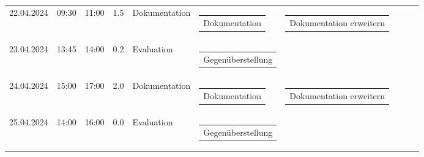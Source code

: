 {\begin{longtable}[H]{lllrllllll}
22.04.2024 & 09:30 & 11:00 & 1.5 & Dokumentation & \begin{tabular}[c]{@{}l@{}}Dokumentation\end{tabular} & \begin{tabular}[c]{@{}l@{}}Dokumentation erweitern\end{tabular} & \begin{tabular}[c]{@{}l@{}}\end{tabular} & \begin{tabular}[c]{@{}l@{}}\end{tabular} & \begin{tabular}[c]{@{}l@{}}\end{tabular} \\
23.04.2024 & 13:45 & 14:00 & 0.2 & Evaluation & \begin{tabular}[c]{@{}l@{}}Gegenüberstellung\end{tabular} & \begin{tabular}[c]{@{}l@{}}\end{tabular} & \begin{tabular}[c]{@{}l@{}}\end{tabular} & \begin{tabular}[c]{@{}l@{}}\end{tabular} & \begin{tabular}[c]{@{}l@{}}\end{tabular} \\
24.04.2024 & 15:00 & 17:00 & 2.0 & Dokumentation & \begin{tabular}[c]{@{}l@{}}Dokumentation\end{tabular} & \begin{tabular}[c]{@{}l@{}}Dokumentation erweitern\end{tabular} & \begin{tabular}[c]{@{}l@{}}\end{tabular} & \begin{tabular}[c]{@{}l@{}}\end{tabular} & \begin{tabular}[c]{@{}l@{}}\end{tabular} \\
25.04.2024 & 14:00 & 16:00 & 0.0 & Evaluation & \begin{tabular}[c]{@{}l@{}}Gegenüberstellung\end{tabular} & \begin{tabular}[c]{@{}l@{}}\end{tabular} & \begin{tabular}[c]{@{}l@{}}\end{tabular} & \begin{tabular}[c]{@{}l@{}}\end{tabular} & \begin{tabular}[c]{@{}l@{}}\end{tabular} \\

\end{longtable}}
